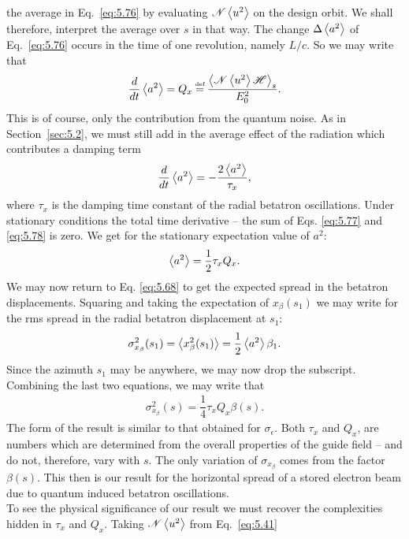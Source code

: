 the average in Eq.~\eqref{eq:5.76} by evaluating $\mathscr{N}\left< u^2 \right>$ on the design orbit. We shall therefore, interpret the average over $s$ in that way.
The change $\Delta \left< a^2 \right>$ of Eq.~\eqref{eq:5.76} occurs in the time of one revolution, namely $L/c$. So we may write that
\begin{align} \label{eq:5.77}
	\dfrac{d}{dt} \mean{a^2} = Q_x \bydef \dfrac{\mean{\mathscr{N}\mean{u^2}\mathscr{H}}_s}{E_0^2}.
\end{align}
This is of course, only the contribution from the quantum noise. As in Section~\ref{sec:5.2}, we must still add in the average effect of the radiation which contributes a damping term
\begin{align} \label{eq:5.78}
	\dfrac{d}{dt} \left< a^2 \right> = - \dfrac{2 \left< a^2 \right>}{\tau_x},
\end{align}
where $\tau_x$ is the damping time constant of the radial betatron oscillations. Under stationary
 conditions the total time derivative -- the sum of Eqs. \eqref{eq:5.77} and \eqref{eq:5.78} is zero. We get for the stationary expectation value of $a^2$:
\begin{align}
	\left< a^2 \right> = \dfrac{1}{2} \tau_x Q_x.
\end{align}
We may now return to Eq. \eqref{eq:5.68} to get the expected spread in the betatron displacements. Squaring and taking the expectation of $x_\beta(s_1)$ we may write for the rms spread in the radial betatron displacement at $s_1$:
\begin{align} \label{eq:5.81}
	\sigma_{x_\beta}^2(s_1) = \left< x_\beta^2(s_1) \right> = \dfrac{1}{2}\left< a^2 \right>\beta_1.
\end{align}
Since the azimuth $s_1$ may be anywhere, we may now drop the subscript. Combining the last two equations, we may write that
\begin{align}
	\sigma_{x_\beta}^2(s) = \dfrac{1}{4} \tau_x Q_x \beta(s).
\end{align}
The form of the result is similar to that obtained for $\sigma_\epsilon$. Both $\tau_x$ and $Q_x$, are numbers which are determined from the overall properties of the guide field -- and do not, therefore, vary with $s$. The only variation of $\sigma_{x_\beta}$ comes from the factor $\beta(s)$. This then is our result for the horizontal spread of a stored electron beam due to quantum induced betatron oscillations.\\
To see the physical significance of our result we must recover the complexities hidden in $\tau_x$ and $Q_x$. Taking $\mathscr{N}\left< u^2 \right>$ from Eq.~\eqref{eq:5.41}
